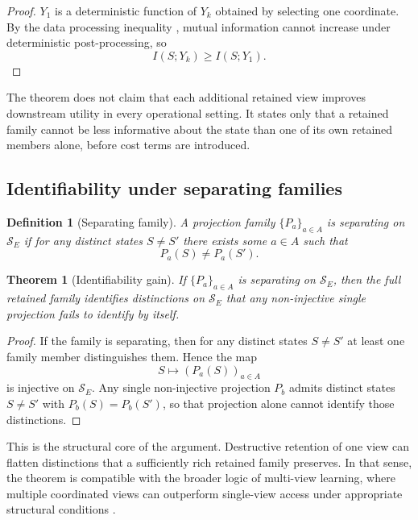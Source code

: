 \documentclass[11pt,a4paper]{article}
\newtheorem{definition}{Definition}
\newtheorem{theorem}{Theorem}
\begin{document}
\begin{proof}
$Y_1$ is a deterministic function of $Y_k$ obtained by selecting one coordinate. By the data processing inequality \cite{cover2006elements}, mutual information cannot increase under deterministic post-processing, so
\begin{equation}
I(S;Y_k) \geq I(S;Y_1).
\end{equation}
\end{proof}

The theorem does not claim that each additional retained view improves downstream utility in every operational setting. It states only that a retained family cannot be less informative about the state than one of its own retained members alone, before cost terms are introduced.

\subsection{Identifiability under separating families}
\label{sec:ident}

\begin{definition}[Separating family]
A projection family $\{P_a\}_{a \in A}$ is separating on $\mathcal{S}_E$ if for any distinct states $S \neq S'$ there exists some $a \in A$ such that
\begin{equation}
P_a(S) \neq P_a(S').
\end{equation}
\end{definition}

\begin{theorem}[Identifiability gain]
\label{thm:ident}
If $\{P_a\}_{a \in A}$ is separating on $\mathcal{S}_E$, then the full retained family identifies distinctions on $\mathcal{S}_E$ that any non-injective single projection fails to identify by itself.
\end{theorem}

\begin{proof}
If the family is separating, then for any distinct states $S \neq S'$ at least one family member distinguishes them. Hence the map
\begin{equation}
S \mapsto (P_a(S))_{a \in A}
\end{equation}
is injective on $\mathcal{S}_E$. Any single non-injective projection $P_b$ admits distinct states $S \neq S'$ with $P_b(S)=P_b(S')$, so that projection alone cannot identify those distinctions.
\end{proof}

This is the structural core of the argument. Destructive retention of one view can flatten distinctions that a sufficiently rich retained family preserves. In that sense, the theorem is compatible with the broader logic of multi-view learning, where multiple coordinated views can outperform single-view access under appropriate structural conditions \cite{balcan2005pac}.
\end{document}

